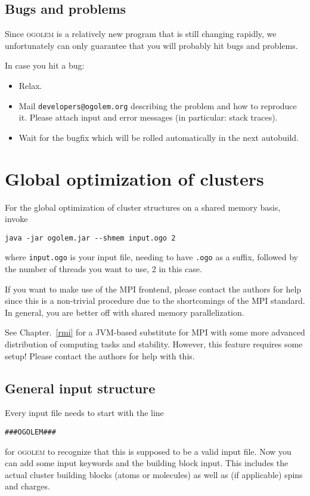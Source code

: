 \documentclass[a4paper,10pt]{scrbook}
\newcommand{\ogo}{\textsc{ogolem}}
\begin{document}
\section{Bugs and problems}
Since \ogo{} is a relatively new program that is still changing rapidly, we
unfortunately can only guarantee that you will probably hit bugs and problems.

In case you hit a bug:
\begin{itemize}
  \item Relax.
  \item Mail \texttt{developers@ogolem.org} describing the problem and how to 
reproduce it. Please attach input and error messages (in particular: stack 
traces).
  \item Wait for the bugfix which will be rolled automatically in the next 
autobuild.
\end{itemize}



\chapter{Global optimization of clusters}
For the global optimization of cluster structures on a shared memory basis,
invoke
\begin{verbatim}
java -jar ogolem.jar --shmem input.ogo 2
\end{verbatim}
where \texttt{input.ogo} is your input file, needing to have \texttt{.ogo} as a
suffix, followed by the number of threads you want to use, 2 in this case.

If you want to make use of the MPI frontend, please contact the authors for help
since this is a non-trivial procedure due to the shortcomings of the MPI
standard. In general, you are better off with shared memory parallelization.

See Chapter.~\ref{rmi} for a JVM-based substitute for MPI with some more
advanced distribution of computing tasks and stability. However, this feature
requires some setup! Please contact the authors for help with this.

\section{General input structure}
Every input file needs to start with the line
\begin{verbatim}
###OGOLEM###
\end{verbatim}
for \ogo{} to recognize that this is supposed to be a valid input file. Now you
can add some input keywords and the building block input. This includes the
actual cluster building blocks (atoms or molecules) as well as (if applicable)
spins and charges.
\end{document}
